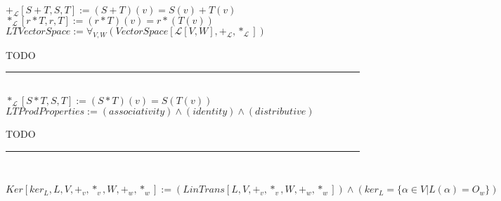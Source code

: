 \documentclass{book}
\newcommand{\abr}{:=}
\newcommand{\pr}[1]{\left(#1\right)}
\begin{document}
\begin{shaded} %
  $+_\mathcal{L}[S + T, S, T] \abr (S + T)(v) = S(v) + T(v)$ \\
  $*_\mathcal{L}[r * T, r, T] \abr (r * T)(v) = r * \pr{T(v)}$ \\
  $LTVectorSpace \abr \forall_{V, W}(VectorSpace[\mathcal{L}[V, W], +_\mathcal{L}, *_\mathcal{L}])$
  \begin{enumerate}
    \lit TODO
  \end{enumerate} \vspace{.75mm} \hrule \vspace{.75mm} \ \\ 

  $*_\mathcal{L}[S * T, S, T] \abr (S * T)(v) = S\pr{T(v)}$ \\
  $LTProdProperties \abr (associativity) \land (identity) \land (distributive)$
  \begin{enumerate}
    \lit TODO
  \end{enumerate} \vspace{.75mm} \hrule \vspace{.75mm} \ \\ 
\end{shaded} %

$Ker[ker_L, L, V, +_v, *_v, W, +_w, *_w] \abr (LinTrans[L, V, +_v, *_v, W, +_w, *_w]) \land \pr{ker_L = \{\alpha \in V | L(\alpha) = O_w\}}$ \\
\end{document}
